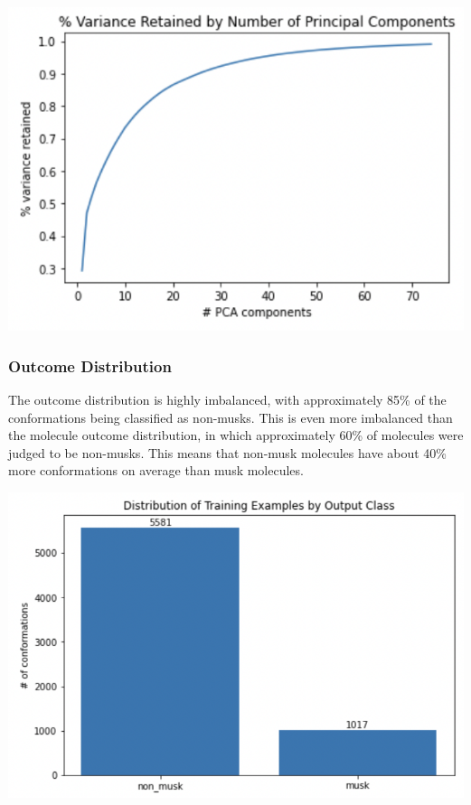 \documentclass[12pt]{article}
\begin{document}
\begin{center}
\includegraphics[scale=0.8]{pca_var_retained.jpg}
\end{center}

\subsubsection{Outcome Distribution}

The outcome distribution is highly imbalanced, with approximately 85\% of the conformations being classified as non-musks. This is even more imbalanced than the molecule outcome distribution, in which approximately 60\% of molecules were judged to be non-musks. This means that non-musk molecules have about 40\% more conformations on average than musk molecules.

\begin{center}
\includegraphics[scale=0.8]{outcome_distrib.jpg}
\end{center}
\end{document}
